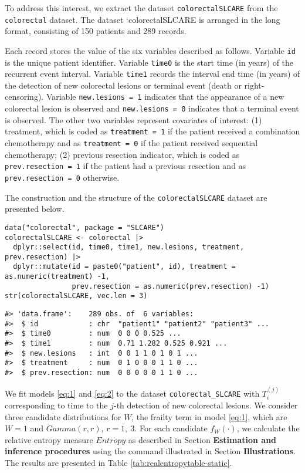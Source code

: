 To address this interest, we extract the dataset \texttt{colorectalSLCARE} from the \texttt{colorectal} dataset. The dataset `colorectalSLCARE is arranged in the long format, consisting of 150 patients and 289 records.

Each record stores the value of the six variables described as follows. Variable \texttt{id} is the unique patient identifier. Variable \texttt{time0} is the start time (in years) of the recurrent event interval. Variable \texttt{time1} records the interval end time (in years) of the detection of new colorectal lesions or terminal event (death or right-censoring). Variable \texttt{new.lesions\ =\ 1} indicates that the appearance of a new colorectal lesion is observed and \texttt{new.lesions\ =\ 0} indicates that a terminal event is observed. The other two variables represent covariates of interest: (1) treatment, which is coded as \texttt{treatment\ =\ 1} if the patient received a combination chemotherapy and as \texttt{treatment\ =\ 0} if the patient received sequential chemotherapy;
(2) previous resection indicator, which is coded as \texttt{prev.resection\ =\ 1} if the patient had a previous resection and as \texttt{prev.resection\ =\ 0} otherwise.

The construction and the structure of the \texttt{colorectalSLCARE}
dataset are presented below.

\begin{verbatim}
data("colorectal", package = "SLCARE")
colorectalSLCARE <- colorectal |>
  dplyr::select(id, time0, time1, new.lesions, treatment, prev.resection) |>
  dplyr::mutate(id = paste0("patient", id), treatment = as.numeric(treatment) -1,
                prev.resection = as.numeric(prev.resection) -1)
str(colorectalSLCARE, vec.len = 3)
\end{verbatim}

\begin{verbatim}
#> 'data.frame':    289 obs. of  6 variables:
#>  $ id            : chr  "patient1" "patient2" "patient3" ...
#>  $ time0         : num  0 0 0 0.525 ...
#>  $ time1         : num  0.71 1.282 0.525 0.921 ...
#>  $ new.lesions   : int  0 0 1 1 0 1 0 1 ...
#>  $ treatment     : num  0 1 0 0 0 1 1 0 ...
#>  $ prev.resection: num  0 0 0 0 0 1 1 0 ...
\end{verbatim}

We fit models \eqref{eq:1} and \eqref{eq:2} to the dataset \texttt{colorectal\_SLCARE} with \(T_i^{(j)}\) corresponding to time to the \(j\)-th detection of new colorectal lesions. We consider
three candidate distributions for \(W\), the frailty term in model \eqref{eq:1}, which are
\(W = 1\) and \(Gamma(r,r)\), \(r = 1,~3\). For each candidate
\(f_W(\cdot)\), we calculate the relative entropy measure \(Entropy\)
as described in Section \textbf{Estimation and inference procedures} using the command illustrated in Section \textbf{Illustrations}. The results are presented in Table
\ref{tab:realentropytable-static}.

